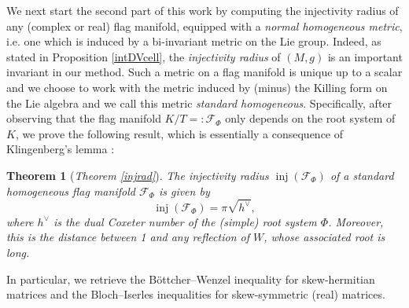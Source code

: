 \documentclass[11pt,twoside]{amsart}
\theoremstyle{plain}
\newtheorem*{theo*}{Theorem}
\DeclareMathOperator\inj{inj}
\begin{document}
We next start the second part of this work by computing the injectivity radius of any (complex or real) flag manifold, equipped with a \textit{normal homogeneous metric}, i.e. one which is induced by a bi-invariant metric on the Lie group. Indeed, as stated in Proposition \ref{intDVcell}, the \textit{injectivity radius} of $(M,g)$ is an important invariant in our method. Such a metric on a flag manifold is unique up to a scalar and we choose to work with the metric induced by (minus) the Killing form on the Lie algebra and we call this metric \textit{standard homogeneous}. Specifically, after observing that the flag manifold $K/T=:\mathcal{F}_\Phi$ only depends on the root system of $K$, we prove the following result, which is essentially a consequence of Klingenberg's lemma \cite[Proposition 2.6.8]{klingenberg_riemann}:
\begin{theo*}[\emph{Theorem \ref{injrad}}]
The injectivity radius $\inj(\mathcal{F}_\Phi)$ of a standard homogeneous flag manifold $\mathcal{F}_\Phi$ is given by
\[\inj(\mathcal{F}_\Phi)=\pi\sqrt{h^\vee},\]
where $h^\vee$ is the dual Coxeter number of the (simple) root system $\Phi$. Moreover, this is the distance between 1 and any reflection of $W$, whose associated root is long.
\end{theo*}
In particular, we retrieve the B\"{o}ttcher--Wenzel inequality \cite{bottcher-wenzel} for skew-hermitian matrices and the Bloch--Iserles inequalities \cite{bloch-iserles} for skew-symmetric (real) matrices.
\end{document}
